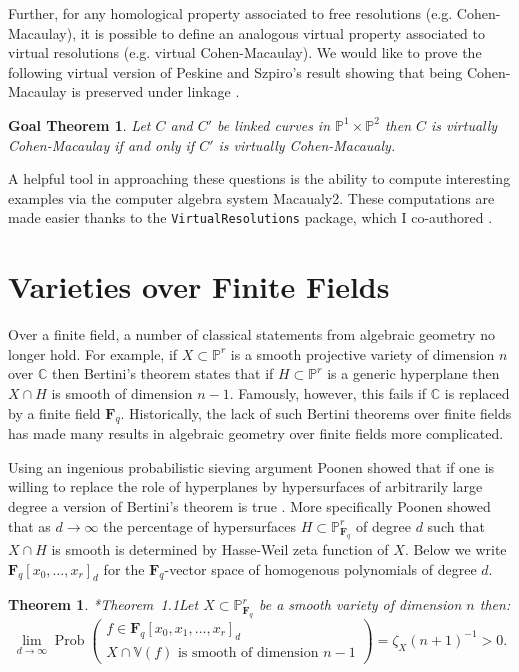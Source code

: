 \documentclass[11pt,reqno]{amsart}
\newtheorem{theorem}[lemma]{Theorem}
\newtheorem{goalTheorem}[lemma]{Goal Theorem}
\theoremstyle{remark}
\newcommand{\Prob}{\operatorname{Prob}}
\newcommand{\fF}{\mathbf F}
\newcommand{\C}{\mathbb{C}}
\renewcommand{\P}{\mathbb{P}}
\newcommand{\V}{\mathbb{V}}
\begin{document}
Further, for any homological property associated to free resolutions (e.g. Cohen-Macaulay), it is possible to define an analogous virtual property associated to virtual resolutions (e.g. virtual Cohen-Macaulay). We would like to prove the following virtual version of Peskine and Szpiro's result showing that being Cohen-Macaulay is preserved under linkage \cite{peskineSzpiro74}. 

\begin{goalTheorem}\label{goalTheorem:virtualACM}
Let $C$ and $C'$ be linked curves in $\P^1\times\P^2$ then $C$ is virtually Cohen-Macaulay if and only if $C'$ is virtually Cohen-Macaualy.
\end{goalTheorem}


A helpful tool in approaching these questions is the ability to compute interesting examples via the computer algebra system Macaualy2. These computations are made easier thanks to the  \texttt{VirtualResolutions} package, which I co-authored \cite{almousaBruce19}.
 
\section{Varieties over Finite Fields}

Over a finite field, a number of classical statements from algebraic geometry no longer hold. For example, if $X\subset\P^r$ is a smooth projective variety of dimension $n$ over $\C$ then Bertini's theorem states that if $H\subset \P^r$ is a generic hyperplane then $X\cap H$ is smooth of dimension $n-1$. Famously, however, this fails if $\C$ is replaced by a finite field $\fF_{q}$. Historically, the lack of such Bertini theorems over finite fields has made many results in algebraic geometry over finite fields more complicated. 

Using an ingenious probabilistic sieving argument Poonen showed that if one is willing to replace the role of hyperplanes by hypersurfaces of arbitrarily large degree a version of Bertini's theorem is true \cite{poonen04}. More specifically Poonen showed that as $d\to\infty$ the percentage of hypersurfaces $H\subset \P_{\fF_{q}}^{r}$ of degree $d$ such that $X\cap H$ is smooth is determined by Hasse-Weil zeta function of $X$. Below we write $\fF_{q}[x_{0},\ldots,x_{r}]_{d}$ for the $\fF_{q}$-vector space of homogenous polynomials of degree $d$. 

\begin{theorem}\cite{poonen04}*{Theorem~1.1}\label{thm:poonen}
Let $X\subset \P^{r}_{\fF_{q}}$ be a smooth variety of dimension $n$ then:
\begin{equation}\label{eq:poonen}
\lim_{d\to \infty} \Prob\left(\begin{matrix} f\in \fF_{q}[x_{0},x_{1},\ldots,x_{r}]_{d}\\ \text{$X\cap \V(f)$ is smooth of dimension $n-1$}\end{matrix}\right)=
\zeta_X(n+1)^{-1} >0.
\end{equation}
\end{theorem}
\end{document}

